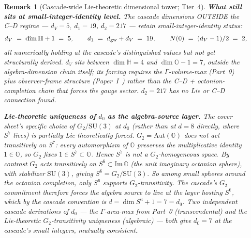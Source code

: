 \documentclass[12pt,a4paper]{article}
\newtheorem*{remark}{Remark}
\begin{document}
\begin{remark}[Cascade-wide Lie-theoretic dimensional tower; Tier~4]
\medskip\noindent\textbf{What still sits at small-integer-identity level.} The cascade dimensions OUTSIDE the C--D regime ---  $d_V = 5$, $d_1 = 19$, $d_2 = 217$ --- retain small-integer-identity status:
\[
d_V \;=\; \dim\mathbb{H} + 1 \;=\; 5, \qquad d_1 \;=\; d_{\rm gw} + d_V \;=\; 19, \qquad N(0) \;=\; (d_V - 1)/2 \;=\; 2,
\]
all numerically holding at the cascade's distinguished values but not yet structurally derived. $d_V$ sits between $\dim\mathbb{H} = 4$ and $\dim\mathbb{O} - 1 = 7$, outside the algebra-dimension chain itself; its forcing requires the $\Gamma$-volume-max (Part~0) plus observer-frame structure (Paper~I~\cite{part0}) rather than the C--D + octonion-completion chain that forces the gauge sector. $d_2 = 217$ has no Lie or C--D connection found.

\medskip\noindent\textbf{Lie-theoretic uniqueness of $d_0$ as the algebra-source layer.} The cover sheet's specific choice of $G_2/\mathrm{SU}(3)$ at $d_0$ (rather than at $d=8$ directly, where $S^7$ lives) is partially Lie-theoretically forced. $G_2 = \mathrm{Aut}(\mathbb{O})$ does \emph{not} act transitively on $S^7$: every automorphism of $\mathbb{O}$ preserves the multiplicative identity $1\in\mathbb{O}$, so $G_2$ fixes $1\in S^7\subset\mathbb{O}$. Hence $S^7$ is not a $G_2$-homogeneous space. By contrast $G_2$ acts transitively on $S^6\subset\mathrm{Im}\,\mathbb{O}$ (the unit imaginary octonion sphere), with stabilizer $\mathrm{SU}(3)$, giving $S^6 = G_2/\mathrm{SU}(3)$. So among small spheres around the octonion completion, only $S^6$ supports $G_2$-transitivity. The cascade's $G_2$ commitment therefore forces the algebra source to live at the layer hosting $S^6$, which by the cascade convention is $d = \dim S^6 + 1 = 7 = d_0$. Two independent cascade derivations of $d_0$ — the $\Gamma$-area-max from Part~0 (transcendental) and the Lie-theoretic $G_2$-transitivity uniqueness (algebraic) — both give $d_0 = 7$ at the cascade's small integers, mutually consistent.


\end{remark}
\end{document}
